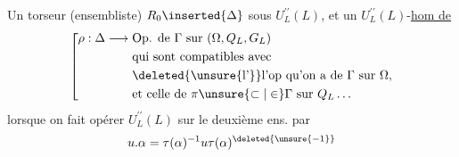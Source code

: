 Un torseur (ensembliste)  $R_0\inserted{\Delta}$ sous $U_L^{\prime\prime}(L)$, et un $U_L^{\prime\prime}(L)$-\uline{hom de}
\[
\left[\begin{aligned}
\rho:\Delta\longrightarrow{}&\text{Op. de }\Gamma\text{ sur }(\Omega,Q_L,G_L)\\
&\text{qui sont compatibles avec}\\
&\text{\deleted{\unsure{l’}}l’op qu’on a de }\Gamma\text{ sur }\Omega,\\
&\text{et celle de }\pi\unsure{\subset|\in}\Gamma\text{ sur }Q_L\ldots
\end{aligned}\right.
\]
lorsque on fait opérer $U_L^{\prime\prime}(L)$  sur le deuxième ens. par
\[
u.\alpha=\tau(\alpha)^{-1}u\tau(\alpha)^{\deleted{\unsure{-1}}}
\]
